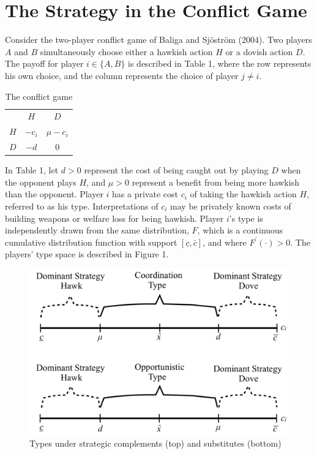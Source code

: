 \documentclass[12pt,english]{article}
\begin{document}


\section{The Strategy in the Conflict Game} 

Consider the two-player conflict game of Baliga and Sj\"ostr\"om (2004). Two players $A$ and $B$ simultaneously choose either a hawkish action $H$ or a dovish action $D$. The payoff for player $i \in \{A,B\}$ is described in Table 1, where the row represents his own choice, and the column represents the choice of player $j \neq i$.
\\

\begin{center}
\begin{table}[h]
\centering
\begin{tabular}{ccc}
  & $H$  & $D$  \\
$H$ & $-c_i$ & $\mu-c_i$ \\
$D$ & $-d$ & $0$ 
\end{tabular}
\caption{The conflict game} 
\end{table}
\end{center}\par
In Table 1, let $d>0$ represent the cost of being caught out by playing $D$ when the opponent plays $H$, and $\mu>0$ represent a benefit from being more hawkish than the opponent. Player $i$ has a private cost $c_i$ of taking the hawkish action $H$, referred to as his type. Interpretations of $c_i$ may be privately known costs of building weapons or welfare loss for being hawkish. Player $i$'s type is independently drawn from the same distribution, $F$, which is a continuous cumulative distribution function with support $[\underline{c}, \bar{c}]$, and where $F^{\prime}(\cdot)>0$. The players' type space is described in Figure 1.\par
\begin{figure}[h]
\centering
	\includegraphics[scale=0.22]{figure1.jpg}
	\caption{Types under strategic complements (top) and substitutes (bottom)}
	\label{fig:1}
\end{figure}
\end{document}
